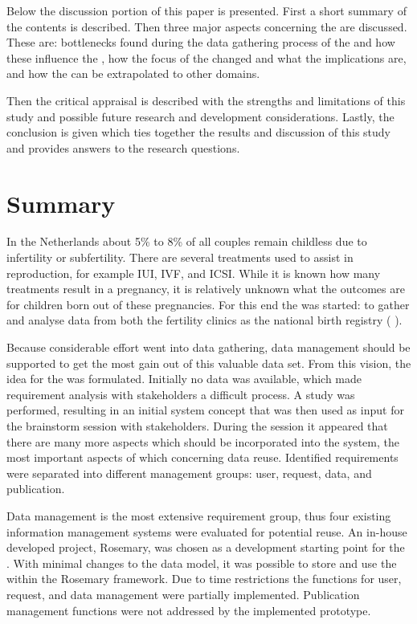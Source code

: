 Below the discussion portion of this paper is presented.
First a short summary of the contents is described.
Then three major aspects concerning the \ivfsystem{} are discussed.
These are: bottlenecks found during the data gathering process of the \projectdata{} and how these influence the \ivfsystem{}, how the focus of the \ivfsystem{} changed and what the implications are, and how the \ivfsystem{} can be extrapolated to other domains.

Then the critical appraisal is described with the strengths and limitations of this study and possible future research and development considerations.
Lastly, the conclusion is given which ties together the results and discussion of this study and provides answers to the research questions.

\section{Summary}

In the Netherlands about 5\% to 8\% of all couples remain childless due to infertility or subfertility.
There are several treatments used to assist in reproduction, for example IUI, IVF, and ICSI.
While it is known how many treatments result in a pregnancy, it is relatively unknown what the outcomes are for children born out of these pregnancies.
For this end the \project{} was started: to gather and analyse data from both the fertility clinics as the national birth registry (\ie{} \PRN{}).

Because considerable effort went into data gathering, data management should be supported to get the most gain out of this valuable data set.
From this vision, the idea for the \ivfsystem{} was formulated.
Initially no data was available, which made requirement analysis with stakeholders a difficult process.
A study was performed, resulting in an initial system concept that was then used as input for the brainstorm session with stakeholders.
During the session it appeared that there are many more aspects which should be incorporated into the system, 
the most important aspects of which concerning data reuse.
Identified requirements were separated into different management groups: user, request, data, and publication.

Data management is the most extensive requirement group, thus four existing information management systems were evaluated for potential reuse.
An in-house developed project, Rosemary, was chosen as a development starting point for the \ivfsystem{}.
With minimal changes to the data model, it was possible to store and use the \projectdata{} within the Rosemary framework.
Due to time restrictions the functions for user, request, and data management were partially implemented.
Publication management functions were not addressed by the implemented prototype.

